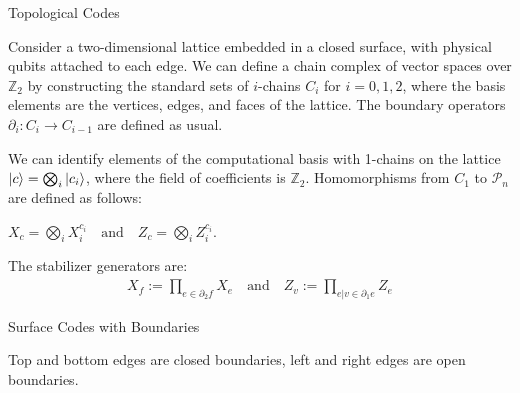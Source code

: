 \documentclass{beamer}
\begin{document}
\begin{frame}{Topological Codes}

    Consider a two-dimensional lattice embedded in a closed surface, with physical qubits attached to each edge. We can define a chain complex of vector spaces over $\mathbb{Z}_2$ by constructing the standard sets of $i$-chains $C_i$ for $i=0,1,2$, where the basis elements are the vertices, edges, and faces of the lattice. The boundary operators $\partial_i: C_i \to C_{i-1}$ are defined as usual. \cite{bombin2013introductiontopologicalquantumcodes}

    We can identify elements of the computational basis with 1-chains on the lattice $\ket{c} = \bigotimes_i \ket{c_i}$, where the field of coefficients is $\mathbb{Z}_2$. Homomorphisms from $C_1$ to $\mathcal{P}_n$ are defined as follows:
\begin{center}
    $X_c = \bigotimes_i X^{c_i}_i \quad \text{and} \quad Z_c = \bigotimes_i Z^{c_i}_i.$
\end{center}

\end{frame}
\begin{frame}    
\begin{figure}
\centering

\label{fig:surface_code}
\end{figure}

The stabilizer generators are:
\begin{align*}
    X_f:= \prod _{e \in \partial_2 f} X_e \quad \text{and} \quad Z_v := \prod _{e |v \in \partial_1 e} Z_e
\end{align*}

\end{frame}

\begin{frame}{Surface Codes with Boundaries}
    
    \begin{figure}
        \centering
        
        \label{fig:surface_code_boundaries}
    \end{figure}
    
Top and bottom edges are closed boundaries, left and right edges are open boundaries. \cite{bravyi1998quantumcodeslatticeboundary}

\end{frame}
\end{document}

